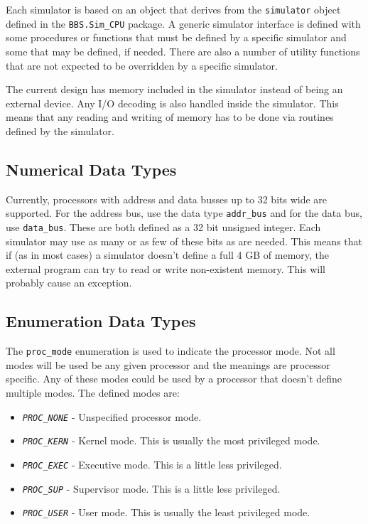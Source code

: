 \documentclass[10pt, openany]{book}
\newcommand{\package}[1]{\texttt{#1}}
\newcommand{\constant}[1]{\emph{\texttt{#1}}}
\newcommand{\datatype}[1]{\texttt{#1}}
\begin{document}
Each simulator is based on an object that derives from the \datatype{simulator} object defined in the \package{BBS.Sim\_CPU} package.  A generic simulator interface is defined with some procedures or functions that must be defined by a specific simulator and some that may be defined, if needed.  There are also a number of utility functions that are not expected to be overridden by a specific simulator.

The current design has memory included in the simulator instead of being an external device.  Any I/O decoding is also handled inside the simulator.  This means that any reading and writing of memory has to be done via routines defined by the simulator.

\subsection{Numerical Data Types}
Currently, processors with address and data busses up to 32 bits wide are supported.  For the address bus, use the data type \datatype{addr\_bus}  and for the data bus, use \datatype{data\_bus}.  These are both defined as a 32 bit unsigned integer.  Each simulator may use as many or as few of these bits as are needed.  This means that if (as in most cases) a simulator doesn't define a full 4 GB of memory, the external program can try to read or write non-existent memory.  This will probably cause an exception.

\subsection{Enumeration Data Types}
The \datatype{proc\_mode} enumeration is used to indicate the processor mode.  Not all modes will be used be any given processor and the meanings are processor specific.  Any of these modes could be used by a processor that doesn't define multiple modes.  The defined modes are:
\begin{itemize}
  \item \constant{PROC\_NONE} - Unspecified processor mode.
  \item \constant{PROC\_KERN} - Kernel mode.  This is usually the most privileged mode.
  \item \constant{PROC\_EXEC} - Executive mode.  This is a little less privileged.
  \item \constant{PROC\_SUP} - Supervisor mode.  This is a little less privileged.
  \item \constant{PROC\_USER} - User mode.  This is usually the least privileged mode.
\end{itemize}
\end{document}
